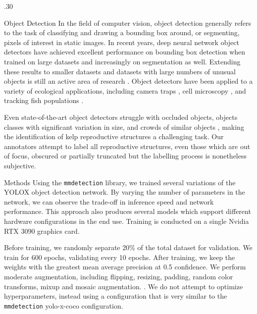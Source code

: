 \documentclass[12pt]{beamer}
\begin{document}
\begin{frame}{}
\begin{columns}[t]
\begin{column}{.30\linewidth}
\begin{block}{Object Detection}
             In the field of computer vision, object detection generally refers to the task of classifying and drawing a bounding box around, or segmenting, pixels of interest in static images. In recent years, deep neural network object detectors have achieved excellent performance on bounding box detection when trained on large datasets \cite{lin_microsoft_2015} and increasingly on segmentation as well. Extending these results to smaller datasets and datasets with large numbers of unusual objects is still an active area of research \cite{gupta_lvis_2019}. Object detectors have been applied to a variety of ecological applications, including camera traps \cite{schneider_deep_2018, noauthor_cameratrapsmegadetectormd_nodate, norouzzadeh_deep_2021}, cell microscopy \cite{waithe_object_2020, hung_applying_2019}, and tracking fish populations \cite{lopez-marcano_automatic_2021, ditria_automating_2020}.
        
             Even state-of-the-art object detectors struggle with occluded objects, objects classes with significant variation in size, and crowds of similar objects \cite{zhan2022trilayer, hutchison_diagnosing_2012}, making the identification of kelp reproductive structures a challenging task. Our annotators attempt to label all reproductive structures, even those which are out of focus, obscured or partially truncated but the labelling process is nonetheless subjective. 
        \end{block}
        \begin{block}{Methods}
            \vspace{1em}
            Using the {\tt mmdetection} \cite{chen_mmdetection_2019} library, we trained several variations of the YOLOX\cite{ge_yolox_2021} object detection network. By varying the number of parameters in the network, we can observe the trade-off in inference speed and network performance. This approach also produces several models which support different hardware configurations in the end use. Training is conducted on a single Nvidia RTX 3090 graphics card. 
            
            Before training, we randomly separate 20\% of the total dataset for validation. We train for 600 epochs, validating every 10 epochs. After training, we keep the weights with the greatest mean average precision at 0.5 confidence. We perform moderate augmentation, including flipping, resizing, padding, random color transforms, mixup and mosaic augmentation.  . We do not attempt to optimize hyperparameters, instead using a configuration that is very similar to the {\tt mmdetection} yolo-x-coco configuration.


\end{block}
\end{column}
\end{columns}
\end{frame}
\end{document}
